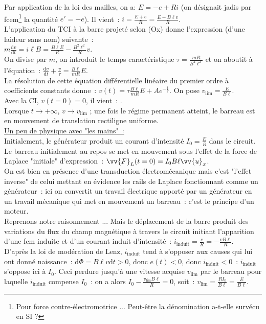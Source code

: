 \documentclass{article}
\newcommand{\mathcolorbox}[2]{\fcolorbox{black}{#1}{$#2$}}
\renewcommand\overrightarrow{\vv}
\begin{document}
Par application de la loi des mailles, on a: $E = -e+Ri$ (on
désignait jadis par fcem\footnote{Pour force contre-électromotrice
... Peut-être la dénomination a-t-elle survécu en SI ?} la quantité
$e' = -e$). Il
vient : $i = \frac{E+e}{R} = \frac{E-B\ell v}{R}$. \\
L'application du TCI à la barre projeté selon (Ox) donne l'expression (d'une laideur sans nom) suivante : \\
$m\frac{\mathrm{d}v}{\mathrm{d}t} = i\ell B = \frac{B \ell E}{R} -
\frac{B^{2}\ell^{2}}{R}v$. \\
On divise par $m$, on introduit le
temps caractéristique $\tau = \frac{mR}{B^{2}\ell^{2}}$ et on
aboutit à
l'équation : $\frac{\mathrm{d}v}{\mathrm{d}t}+\frac{v}{\tau} = \frac{B\ell}{mR}E$. \\
La résolution de cette équation différentielle linéaire du premier
ordre à coefficients constants donne : $v(t) = \tau\frac{B\ell}{mR}E
+Ae^{-\frac{t}{\tau}}$. On pose $v_{\mathrm{lim}} = \frac{E}{B\ell}$. \\
Avec la CI, $v(t=0) = 0$, il vient : \mathcolorbox{gray!20}{v(t) =
v_{\mathrm{lim}}\left[1-e^{-\frac{t}{\tau}}\right]}. \\
Lorsque $t \rightarrow +\infty$, $v \rightarrow v_{\mathrm{lim}}$ ; une fois
le régime permanent atteint, le barreau est en mouvement de
translation rectiligne uniforme. \\
\underline{Un peu de physique avec "les mains" :} \\
Initialement, le générateur produit un courant d'intensité $I_{0} =
\frac{E}{R}$ dans le circuit. Le barreau initialement au repos se
met en mouvement sous l'effet de la force de Laplace "initiale"
d'expression : $\overrightarrow{F}_{L} (t=0) =
I_{0}B \ell\overrightarrow{u}_{x}$. \\
On est bien en présence d'une transduction électromécanique mais
c'est "l'effet inverse" de celui mettant en évidence les rails de
Laplace fonctionnant comme un générateur : ici on convertit un
travail électrique apporté par un générateur en un travail mécanique
qui met en mouvement un barreau : c'est le principe d'un moteur.\\
Reprenons notre raisonnement ... Mais le déplacement de la barre
produit des variations du flux du champ magnétique à travers le
circuit initiant l'apparition d'une fem induite et d'un courant
induit d'intensité : $i_{\mathrm{in\mathrm{d}uit}} =
\frac{e}{R} = -\frac{vB\ell}{R}$. \\
D'après la loi de modération de Lenz, $i_{\mathrm{in\mathrm{d}uit}}$ tend à s'opposer
aux causes qui lui ont donné naissance : $\mathrm{d}\Phi = B\ell v \mathrm{d}t >0$,
donc $e(t) < 0$, donc $i_{\mathrm{in\mathrm{d}uit}} < 0$ : $i_{\mathrm{in\mathrm{d}uit}}$ s'oppose ici à
$I_{0}$. Ceci perdure jusqu'à une vitesse acquise $v_{\mathrm{lim}}$ par le
barreau pour laquelle $i_{\mathrm{in\mathrm{d}uit}}$ compense $I_{0}$ : on a alors
$I_{0}-\frac{v_{\mathrm{lim}}B\ell}{R}=0$, soit : $v_{\mathrm{lim}} = \frac{RI_{0}}{B
\ell} = \frac{E}{B \ell}$.\\
\end{document}
